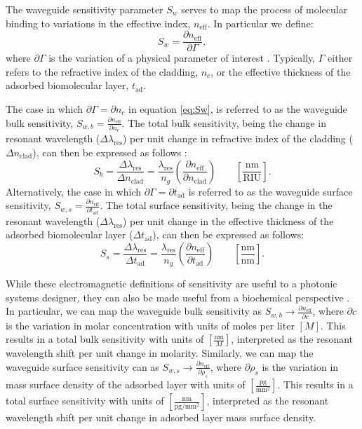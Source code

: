 \documentclass[aps,prl,twocolumn, superscriptaddress,nobalancelastpage]{revtex4}
\begin{document}
The waveguide sensitivity parameter $S_w$ serves to map the process of molecular binding to variations in the effective index, $n_\text{eff}$. In particular we define:
\begin{equation}
    S_w = \frac{\partial n_\text{eff}}{\partial \Gamma},
    \label{eq:Sw}
\end{equation}
where $\partial \Gamma$ is the variation of a physical parameter of interest \cite{sipresonators}. Typically, $\Gamma$ either refers to the refractive index of the cladding, $n_c$, or the effective thickness of the adsorbed biomolecular layer, $t_\text{ad}$.

The case in which $\partial \Gamma = \partial n_c$ in equation \eqref{eq:Sw}, is referred to as the waveguide bulk sensitivity, $S_{w,b} = \frac{\partial n_\text{eff}}{\partial n_c}$. The total bulk sensitivity, being the change in resonant wavelength ($\Delta \lambda_\text{res}$) per unit change in refractive index of the cladding ($\Delta n_\text{clad}$), can then be expressed as follows \cite{swg3}:
\begin{equation}
    S_b = \frac{\Delta \lambda_\text{res}}{\Delta n_\text{clad}} = \frac{\lambda_\text{res}}{n_g}\left(\frac{\partial n_\text{eff}}{\partial n_\text{clad}}\right) \qquad \left[\frac{\text{nm}}{\text{RIU}}\right].
    \label{eq:Sbulk}
\end{equation}
Alternatively, the case in which $\partial \Gamma = \partial t_\text{ad}$ is referred to as the waveguide surface sensitivity,  $S_{w,s} = \frac{\partial n_\text{eff}}{\partial t_\text{ad}}$. The total surface sensitivity, being the change in the resonant wavelength ($\Delta \lambda_\text{res}$) per unit change in the effective thickness of the adsorbed biomolecular layer ($ \Delta t_\text{ad}$), can then be expressed as follows:
\begin{equation}
    S_s = \frac{\Delta \lambda_\text{res}}{\Delta t_\text{ad}} = \frac{\lambda_\text{res}}{n_g}\left(\frac{\partial n_\text{eff}}{\partial t_\text{ad}}\right) \qquad \left[\frac{\text{nm}}{\text{nm}}\right].
    \label{eq:Ssurf}
\end{equation}

While these electromagnetic definitions of sensitivity are useful to a photonic systems designer, they can also be made useful from a biochemical perspective \cite{swg1}. In particular, we can map the waveguide bulk sensitivity as $S_{w,b} \to \frac{\partial n_\text{eff}}{\partial c}$, where $\partial c$ is the variation in molar concentration with units of moles per liter $\left[M\right]$. This results in a total bulk sensitivity with units of $\left[\frac{\text{nm}}{M}\right]$, interpreted as the resonant wavelength shift per unit change in molarity. Similarly, we can map the waveguide surface sensitivity can as $S_{w,s} \to \frac{\partial n_\text{eff}}{\partial \rho_s}$, where $\partial \rho_s$ is the variation in mass surface density of the adsorbed layer with units of $\left[\frac{\text{pg}}{\text{mm}^2}\right]$. This results in a total surface sensitivity with units of $\left[\frac{\text{nm}}{\text{pg}/\text{mm}^2}\right]$, interpreted as the resonant wavelength shift per unit change in adsorbed layer mass surface density.
\end{document}
